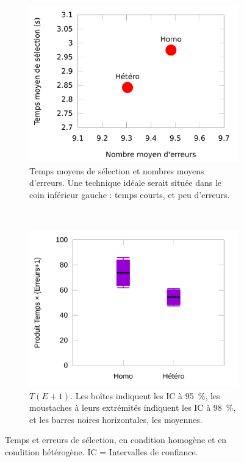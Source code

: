 \begin{figure}[!htb]
\begin{subfigure}[t]{0.49\textwidth}
			\centering
			\includegraphics[width=\textwidth]{figures/ch5/errorsTimesScatter}
			\caption{Temps moyens de sélection et nombres moyens d'erreurs. Une technique \og idéale \fg{} serait située dans le coin inférieur gauche : temps courts, et peu d'erreurs.}
			\label{fig:errorsTimesScatter}
		\end{subfigure}
		~
		\begin{subfigure}[t]{0.49\textwidth}
			\centering
			\includegraphics[width=\textwidth]{figures/ch5/productRes}
			\caption{$T(E+1)$. Les boîtes indiquent les IC à 95~\%{}, les \og moustaches \fg{} à leurs extrémités indiquent les IC à 98~\%{}, et les barres noires horizontales, les moyennes.}
			\label{fig:productRes}
		\end{subfigure}
		\caption[Temps et erreurs de sélection, homogène vs. hétérogène]{Temps et erreurs de sélection, en condition homogène et en condition hétérogène. IC = Intervalles de confiance.}
		\label{fig:timeAndErrorRes}
	\end{figure}
	
